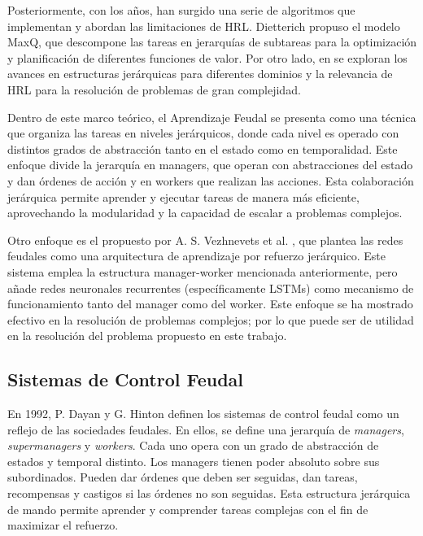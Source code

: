 \documentclass[letterpaper]{article} %
\begin{document}
Posteriormente, con los años, han surgido una serie de algoritmos que implementan y abordan las limitaciones de HRL. 
Dietterich \cite{dietterich2000hierarchical} propuso el modelo MaxQ, que descompone las tareas en jerarquías de subtareas
para la optimización y planificación de diferentes funciones de valor. Por otro lado, en \cite{barto2003recent} se exploran 
los avances en estructuras jerárquicas para diferentes dominios y la relevancia de HRL para la resolución de problemas de 
gran complejidad.  

Dentro de este marco teórico, el Aprendizaje Feudal se presenta como una técnica que organiza las tareas en niveles jerárquicos, donde cada nivel 
es operado con distintos grados de abstracción tanto en el estado como en temporalidad. Este enfoque \cite{dayan1992feudal} divide la jerarquía en managers, que operan con abstracciones 
del estado y dan órdenes de acción y en workers que realizan las acciones. Esta colaboración jerárquica permite aprender y ejecutar tareas de manera más eficiente, aprovechando
la modularidad y la capacidad de escalar a problemas complejos.

Otro enfoque es el propuesto por A. S. Vezhnevets et al. \cite{vezhnevets2017feudal}, que plantea las redes feudales como una arquitectura de aprendizaje por refuerzo jerárquico.
Este sistema emplea la estructura manager-worker mencionada anteriormente, pero añade redes neuronales recurrentes (específicamente LSTMs) como mecanismo de funcionamiento tanto del 
manager como del worker. Este enfoque se ha mostrado efectivo en la resolución de problemas complejos; por lo que puede ser de utilidad en la resolución del problema propuesto en este trabajo.

\subsection{Sistemas de Control Feudal}
En 1992, P. Dayan y G. Hinton \cite{dayan1992feudal} definen los sistemas de control feudal como un reflejo de las sociedades feudales. En ellos, se 
define una jerarquía de \textit{managers}, \textit{supermanagers} y \textit{workers}. Cada uno opera con un grado de abstracción de estados y temporal
distinto. Los managers tienen poder absoluto sobre sus subordinados. Pueden dar órdenes que deben ser seguidas, dan tareas, recompensas y castigos si 
las órdenes no son seguidas. Esta estructura jerárquica de mando permite aprender y comprender tareas complejas con el fin de maximizar el refuerzo.
\end{document}
